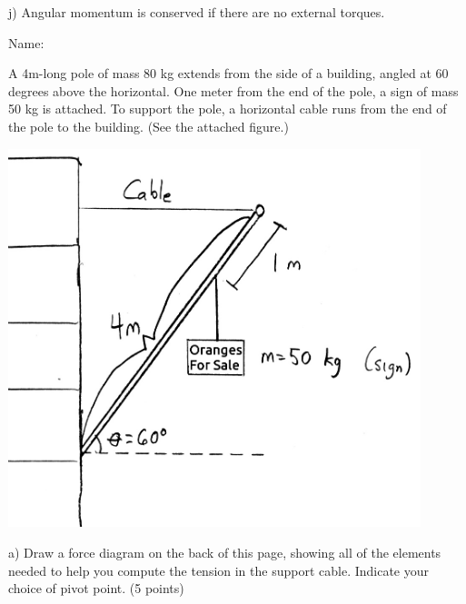 \documentclass[12pt]{article}
\begin{document}
\bigskip

j) Angular momentum is conserved if there are no external torques.


\newpage


\begin{flushright}
Name: \underline{\hspace{3in}}
        \end{flushright}

\begin{minipage}[b]{0.4\textwidth}
  \small
  \vspace{-0.8in}
A 4m-long pole of mass 80 kg extends from the side of a building, angled at 60 degrees above the horizontal. One meter from the end of the pole, a sign of mass 50 kg is attached. To support the pole,
a horizontal cable runs from the end of the pole to the building. (See the attached figure.)

\bigskip
\bigskip

\end{minipage}
\begin{minipage}[t]{0.6\textwidth}
  \begin{flushright}
  \includegraphics[width=0.9\textwidth]{sign2.jpg}
\end{flushright}
\end{minipage}

\bigskip
\bigskip

\it

a) Draw a force diagram on the back of this page, showing all of the elements needed to help you compute the tension in the support cable. Indicate 
your choice of pivot point. (5 points)
\end{document}
